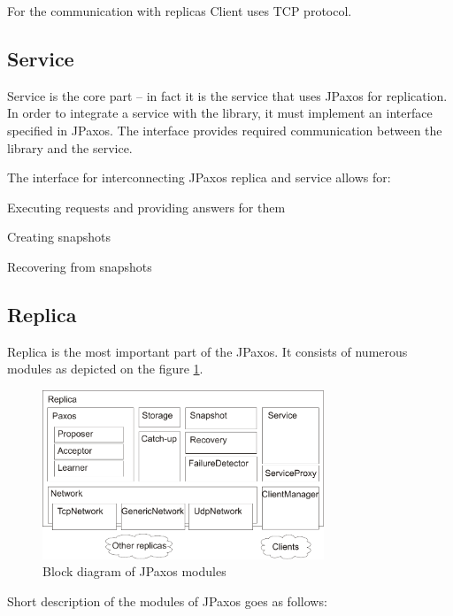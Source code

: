 \noindent For the communication with replicas Client uses TCP protocol.

\subsection{Service}

Service is the core part -- in fact it is the service that uses JPaxos for replication.
In order to integrate a service with the library, it must implement an interface specified in JPaxos. The interface provides required communication between the library and the service.

The interface for interconnecting JPaxos replica and service allows for:
\begin{tightList}
 \item[\textbullet] Executing requests and providing answers for them
 \item[\textbullet] Creating snapshots
 \item[\textbullet] Recovering from snapshots
\end{tightList}

\subsection{Replica}

Replica is the most important part of the JPaxos. It consists of numerous modules as depicted on the figure \ref{fig:replica_architecture}.

\begin{figure}[h]
 \centering
 \includegraphics[keepaspectratio, width=0.75\textwidth]{architecture/replica_architecture.pdf}
 \caption{Block diagram of JPaxos modules}
 \label{fig:replica_architecture}
\end{figure}

Short description of the modules of JPaxos goes as follows:

